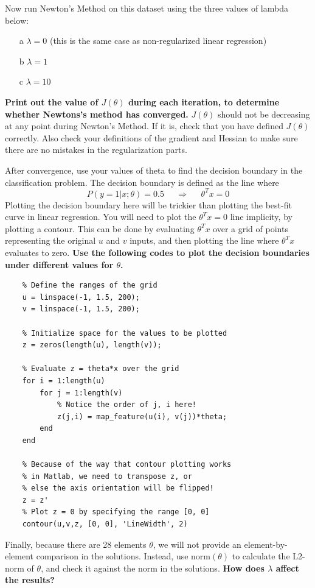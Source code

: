 \documentclass[10pt,a4paper]{article}
\begin{document}
  Now run Newton's Method on this dataset using the three values of lambda below:
  \begin{itemize}
    \item[a] $\lambda = 0$ (this is the same case as non-regularized linear regression)
    \item[b] $\lambda = 1$
    \item[c] $\lambda = 10$
  \end{itemize}
  \textbf{Print out the value of $J(\theta)$ during each iteration, to determine whether Newtons's method has converged.} $J(\theta)$ should not be decreasing at any point during Newton's Method. If it is, check that you have defined $J(\theta)$ correctly. Also check your definitions of the gradient and Hessian to make sure there are no mistakes in the regularization parts.

  After convergence, use your values of theta to find the decision boundary in the classification problem. The decision boundary is defined as the line where 
  \begin{displaymath}
    P(y=1\vert x; \theta) = 0.5 \;\;\;\;\; \Longrightarrow \;\;\;\;\;  \theta^Tx = 0
  \end{displaymath}
  Plotting the decision boundary here will be trickier than plotting the best-fit curve in linear regression. You will need to plot the  $\theta^T x = 0$ line implicity, by plotting a contour. This can be done by evaluating $\theta^Tx$ over a grid of points representing the original $u$ and $v$ inputs, and then plotting the line where $\theta^Tx$ evaluates to zero.
  \textbf{Use the following codes to plot the decision boundaries under different values for $\theta$.}
  \begin{lstlisting}
    % Define the ranges of the grid
    u = linspace(-1, 1.5, 200);
    v = linspace(-1, 1.5, 200);

    % Initialize space for the values to be plotted
    z = zeros(length(u), length(v));

    % Evaluate z = theta*x over the grid
    for i = 1:length(u)
        for j = 1:length(v)
            % Notice the order of j, i here!
            z(j,i) = map_feature(u(i), v(j))*theta;
        end
    end

    % Because of the way that contour plotting works
    % in Matlab, we need to transpose z, or
    % else the axis orientation will be flipped!
    z = z'
    % Plot z = 0 by specifying the range [0, 0]
    contour(u,v,z, [0, 0], 'LineWidth', 2)
  \end{lstlisting}


  
  Finally, because there are 28 elements $\theta$, we will not provide an element-by-element comparison in the solutions. Instead, use \textsf{norm$(\theta)$} to calculate the L2-norm of $\theta$, and check it against the norm in the solutions. \textbf{How does $\lambda$ affect the results?}
\end{document}
